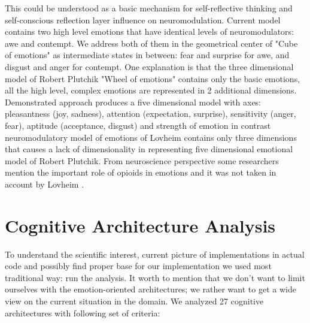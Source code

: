 This could be understood as a basic mechanism for self-reflective thinking and self-conscious reflection layer influence on neuromodulation. Current model contains two high level emotions that have identical levels of neuromodulators: awe and contempt. We address both of them in the geometrical center of "Cube of emotions" \cite{cubeofemotions} as intermediate states in between: fear and surprise for awe, and disgust and anger for contempt. One explanation is that the three dimensional model of Robert Plutchik "Wheel of emotions" contains only the basic emotions, all the high level, complex emotions are represented in 2 additional dimensions. Demonstrated approach produces a five dimensional model with axes: pleasantness (joy, sadness), attention (expectation, surprise), sensitivity (anger, fear), aptitude (acceptance, disgust) and strength of emotion \cite{senticcomputing} in contrast neuromodulatory model of emotions of Lovheim contains only three dimensions that causes a lack of dimensionality in representing five dimensional emotional model of Robert Plutchik. From neuroscience perspective some researchers mention the important role of opioids in emotions and it was not taken in account by Lovheim \cite{emotionsbraintorobot}.

\section{Cognitive Architecture Analysis}

To understand the scientific interest, current picture of implementations in actual code and possibly find proper base for our implementation we used most traditional way: run the analysis. It worth to mention that we don't want to limit ourselves with the emotion-oriented architectures; we rather want to get a wide view on the current situation in the domain. We analyzed 27 cognitive architectures with following set of criteria:

